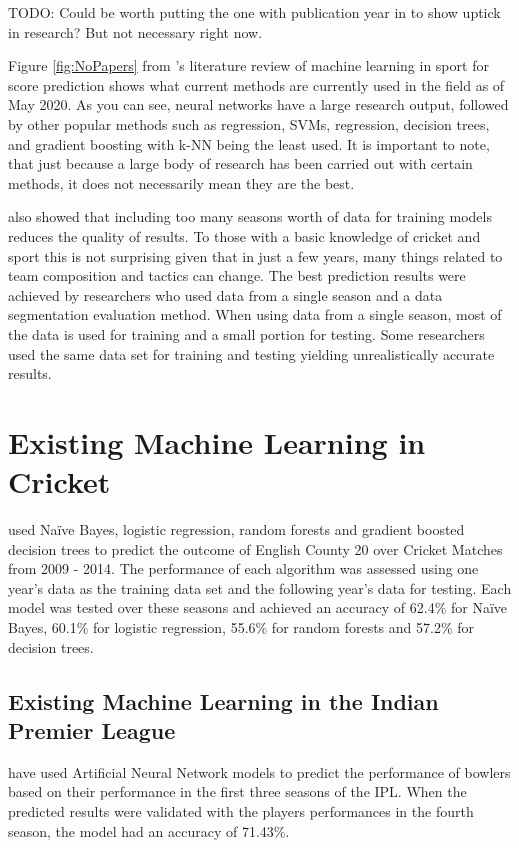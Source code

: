 \documentclass[12pt,a4paper]{report}
\begin{document}
TODO: Could be worth putting the one with publication year in to show uptick in research? But not necessary right now.

Figure \ref{fig:NoPapers} from \citet{horvat2020}'s literature review of machine learning in sport for score prediction shows what current methods are currently used in the field as of May 2020. 
As you can see, neural networks have a large research output, followed by other popular methods such as regression, SVMs, regression, decision trees, and gradient boosting with k-NN being the least used. 
It is important to note, that just because a large body of research has been carried out with certain methods, it does not necessarily mean they are the best. 

\citet{horvat2020} also showed that including too many seasons worth of data for training models reduces the quality of results. 
To those with a basic knowledge of cricket and sport this is not surprising given that in just a few years, many things related to team composition and tactics can change. 
The best prediction results were achieved by researchers who used data from a single season and a data segmentation evaluation method. 
When using data from a single season, most of the data is used for training and a small portion for testing. 
Some researchers used the same data set for training and testing yielding unrealistically accurate results.

\section{Existing Machine Learning in Cricket}

\citet{KampakisStylianos2015} used Naïve Bayes, logistic regression, random forests and gradient boosted decision trees to predict the outcome of English County 20 over Cricket Matches from 2009 - 2014. 
The performance of each algorithm was assessed using one year's data as the training data set and the following year's data for testing. 
Each model was tested over these seasons and achieved an accuracy of 62.4\% for Naïve Bayes, 60.1\% for logistic regression, 55.6\% for random forests and 57.2\% for decision trees.

\subsection{Existing Machine Learning in the Indian Premier League}

\citet{Saikia2012} have used Artificial Neural Network models to predict the performance of bowlers based on their performance in the first three seasons of the IPL. 
When the predicted results were validated with the players performances in the fourth season, the model had an accuracy of 71.43\%.
\end{document}
